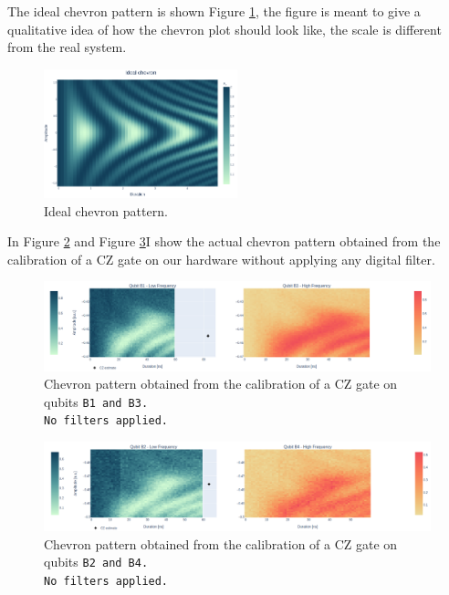 The ideal chevron pattern is shown Figure \ref{fig:expected_chevron}, the figure is meant to give a qualitative idea of how the chevron plot should look like, the scale is different from the real system.

\begin{figure}[h!]
    \centering
    \includegraphics[width=0.5\textwidth]{figures/png/IdealChevron.png}
    \caption{Ideal chevron pattern.}
    \label{fig:expected_chevron}
\end{figure}

\newpage
{}
In Figure \ref{fig:B1B3_nofilter} and Figure \ref{fig:B2B4_nofilter}I show the actual chevron pattern obtained from the calibration of a CZ gate on our hardware without applying any digital filter.

\begin{figure}[h!]
    \centering
    \includegraphics[width=\textwidth]{figures/png/Cryoscope/B1B3_nofilter.png}
    \caption{Chevron pattern obtained from the calibration of a CZ gate on qubits \tt{B1} and \tt{B3}.\\ No filters applied.}
    \label{fig:B1B3_nofilter}
\end{figure}

\begin{figure}[h!]
    \centering
    \includegraphics[width=\textwidth]{figures/png/Cryoscope/B2B4_nofilter.png}
    \caption{Chevron pattern obtained from the calibration of a CZ gate on qubits \tt{B2} and \tt{B4}.\\ No filters applied.}
    \label{fig:B2B4_nofilter}
\end{figure}

